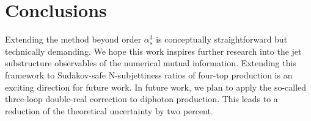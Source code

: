 \section{Conclusions}\label{sec:conclusions}

Extending the method beyond order $\alpha_s^3$ is conceptually
straightforward but technically demanding. We hope this work inspires
further research into the jet substructure observables of the numerical
mutual information. Extending this framework to Sudakov-safe
N-subjettiness ratios of four-top production is an exciting direction
for future work. In future work, we plan to apply the so-called
three-loop double-real correction to diphoton production. This leads to
a reduction of the theoretical uncertainty by two percent.

